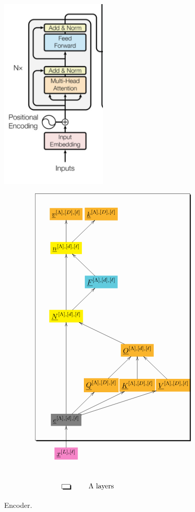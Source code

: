 \documentclass[12pt]{article}
\begin{document}
\begin{figure}[h!]\centering
\begin{minipage}{.4\linewidth}
\includegraphics[width=2in]{encoder.jpg}
\end{minipage}%
\begin{minipage}{.6\linewidth}
$$\xymatrix@R=2.5pc@C=0.1pc{
*+[F*:Dandelion]{\underline{v}^{[\Lambda],[D], [\ell]}}&*+[F*:Dandelion]{\underline{k}^{[\Lambda],[D], [\ell]}}&&
\\
*+[F*:yellow]{\underline{n}^{[\Lambda],[d], [\ell]}}\ar[ur]\ar[u]&&&
\\
&*+[F*:SkyBlue]{\underline{F}^{[\Lambda],[d], [\ell]}}\ar[ul]&&
\\
*+[F*:yellow]{\underline{N}^{[\Lambda],[d], [\ell]}}\ar[ur]\ar[uu]&&&
\\
&&*+[F*:Dandelion]{\underline{O}^{[\Lambda],[d], [\ell]}}\ar[ull]&
\\
&*+[F*:Dandelion]{\underline{Q}^{[\Lambda],[D], [\ell]}}\ar[ur]&*+[F*:Dandelion]{\underline{K}^{[\Lambda],[D], [\ell]}}\ar[u]&*+[F*:Dandelion]{\underline{V}^{[\Lambda],[D], [\ell]}}\ar[ul]
\\
*+[F*:gray]{\underline{e}^{[\Lambda],[d], [\ell]}}\ar[urr]\ar[uuu]\ar[ur]\ar[urrr]&&&
\\
*+[F*:Lavender]{\underline{x}^{[L],[\ell]}}\ar[u]&&&
\save
\POS"1,1"."7,1"."1,4"."7,4"!C*+<4.0em>\frm{-,}
\restore
\\
*+[F-,]{\;\;}&\text{$\Lambda$ layers}
}$$
\end{minipage}
\caption{Encoder.}
\label{fig-texnn-for-encoder}
\end{figure}
\end{document}
